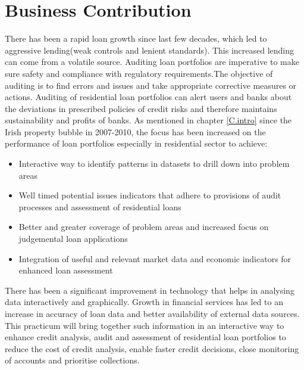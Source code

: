 \section{Business Contribution}
There has been a rapid loan growth since last few decades, which led to aggressive lending(weak controls and lenient standards). This increased lending can come from a volatile source. Auditing loan portfolios are imperative to make sure safety and compliance with regulatory requirements.The objective of auditing is to find errors and issues and take appropriate corrective measures or actions. Auditing of residential loan portfolios can alert users and banks about the deviations in prescribed policies of credit risks and therefore maintains sustainability and profits of banks. As mentioned in chapter \ref{C.intro} since the Irish property bubble in 2007-2010, the focus has been increased on the performance of loan portfolios especially in residential sector to achieve:
\begin{itemize}
\item Interactive way to identify patterns in datasets to drill down into problem areas
\item Well timed potential issues indicators that adhere to provisions of audit processes and assessment of residential loans
\item Better and greater coverage of problem areas and increased focus on judgemental loan applications
\item Integration of useful and relevant market data and economic indicators for enhanced loan assessment
\end{itemize}

There has been a significant improvement in technology that helps in analysing data interactively and graphically. Growth in financial services has led to an increase in accuracy of loan data and better availability of external data sources. This practicum will bring together such information in an interactive way to enhance credit analysis, audit and assessment of residential loan portfolios to reduce the cost of credit analysis, enable faster credit decisions, close monitoring of accounts and prioritise collections.
 